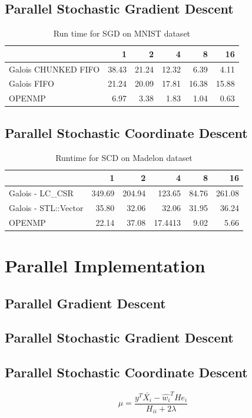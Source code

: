 \documentclass{sigplanconf}
\begin{document}
\subsection{Parallel Stochastic Gradient Descent}
\begin{table}[htbp]
\caption{Run time for SGD on MNIST dataset}
\begin{tabular}{|l|r|r|r|r|r|}
\hline
 & 1 & 2 & 4 & 8 & 16 \\ \hline
Galois CHUNKED FIFO & 38.43 & 21.24 & 12.32 & 6.39 & 4.11 \\ \hline
Galois FIFO & 21.24 & 20.09 & 17.81 & 16.38 & 15.88 \\ \hline
OPENMP & 6.97 & 3.38 & 1.83 & 1.04 & 0.63 \\ \hline
\end{tabular}
\label{Label of the table}
\end{table}



\subsection{Parallel Stochastic Coordinate Descent}

\begin{table}[htbp]
\caption{Runtime for SCD on Madelon dataset}
\begin{tabular}{|l|r|r|r|r|r|}
\hline
 & 1 & 2 & 4 & 8 & 16 \\ \hline
Galois - LC\_CSR & 349.69 & 204.94 & 123.65 & 84.76 & 261.08 \\ \hline
Galois - STL::Vector  & 35.80 & 32.06 & 32.06 & 31.95 & 36.24 \\ \hline
OPENMP & 22.14 & 37.08 & 17.4413 & 9.02 & 5.66 \\ \hline
\end{tabular}
\label{Label of the table}
\end{table}


\section{Parallel Implementation}
\subsection{Parallel Gradient Descent}
\subsection{Parallel Stochastic Gradient Descent}
\subsection{Parallel Stochastic Coordinate Descent}
\begin{equation} \mu = \frac{y^T \bar{X_i} - \widehat{w_i}^T H e_i }{H_{ii} + 2\lambda} \end{equation}
\end{document}

